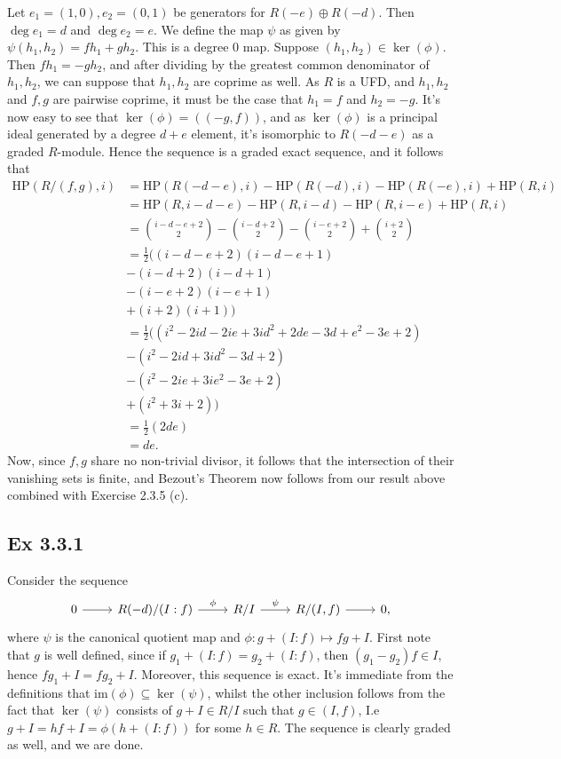 \documentclass{article}
\theoremstyle{definition}
\newcommand{\HP}{\text{HP}}
\newcommand{\im}{\text{im}}
\begin{document}
Let $e_1 = (1, 0), e_2 = (0, 1)$ be generators for $R(-e) \oplus R(-d)$. Then
$\deg e_1 = d$ and $\deg e_2 = e$. We define the map $\psi$ as given by
$\psi(h_1, h_2) = fh_1 + gh_2$. This is a degree $0$ map. Suppose $(h_1, h_2)
\in \ker(\phi)$. Then $fh_1 = -gh_2$, and after dividing by the greatest common
denominator of $h_1, h_2$, we can suppose that $h_1, h_2$ are coprime as well.
As $R$ is a UFD, and $h_1, h_2$ and $f, g$ are pairwise coprime, it must be the
case that $h_1 = f$ and $h_2 = -g$. It's now easy to see that $\ker(\phi) =
((-g, f))$, and as $\ker(\phi)$ is a principal ideal generated by a degree $d +
e$ element, it's isomorphic to $R(-d - e)$ as a graded $R$-module. Hence the
sequence is a graded exact sequence, and it follows that 
\begin{align*}
	\HP(R/(f, g), i)
	&=
	\HP(R(-d-e), i)
	-
	\HP(R(-d), i)
	-
	\HP(R(-e), i)
	+
	\HP(R, i) \\
	&=
	\HP(R, i - d - e)
	-
	\HP(R, i - d)
	-
	\HP(R, i - e)
	+
	\HP(R, i) \\
	&=
	\binom{i - d - e + 2}{2}
	-
	\binom{i - d + 2}{2}
	-
	\binom{i - e + 2}{2}
	+
	\binom{i + 2}{2} \\
	&=
	\frac{1}{2}
	\big(
	(i - d - e + 2)(i - d - e + 1) \\
	&-
	(i - d + 2)(i - d + 1) \\
	&-
	(i - e + 2)(i - e + 1) \\
	&+
	(i + 2)(i + 1)
	\big) \\
	&=
	\frac{1}{2}
	\big(
	(i^2 - 2id - 2ie + 3i d^2 + 2de - 3d + e^2 - 3e + 2) \\
	&-
	(i^2 - 2id + 3i d^2 - 3d + 2) \\
	&-
	(i^2 - 2ie + 3i e^2 - 3e + 2) \\
	&+
	(i^2 + 3i + 2)
	\big) \\
	&=
	\frac{1}{2}
	\left(
		2de
	\right) \\
	&=
	d e.
\end{align*}
Now, since $f, g$ share no non-trivial divisor, it follows that the
intersection of their vanishing sets is finite, and Bezout's Theorem now
follows from our result above combined with Exercise 2.3.5 (c).

\subsection*{Ex 3.3.1}

Consider the sequence
\[
\begin{tikzcd}
  0 
  \arrow[r] & 
  R(-d) / (I : f)
  \arrow[r, "\phi"] & 
  R / I
  \arrow[r, "\psi"] & 
  R / (I, f)
  \ar[r] & 
  0,
\end{tikzcd}
\] 
where $\psi$ is the canonical quotient map and $\phi : g + (I : f) \mapsto fg +
I$. First note that $g$ is well defined, since if $g_1 + (I : f) = g_2 + (I :
f)$, then $(g_1 - g_2)f \in I$, hence $fg_1 + I = fg_2 + I$. Moreover, this
sequence is exact. It's immediate from the definitions that $\im(\phi)
\subseteq \ker(\psi)$, whilst the other inclusion follows from the fact that
$\ker(\psi)$ consists of $g + I \in R/I$ such that $g \in (I, f)$, I.e $g + I =
hf + I = \phi(h + (I : f))$ for some $h \in R$. The sequence is clearly graded
as well, and we are done.
\end{document}
